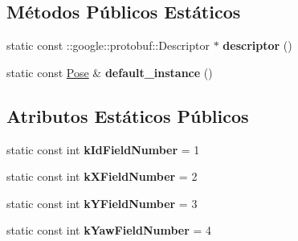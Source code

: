 \subsection*{Métodos Públicos Estáticos}
\begin{DoxyCompactItemize}
\item 
static const \+::google\+::protobuf\+::\+Descriptor $\ast$ {\bfseries descriptor} ()\hypertarget{classvss__debug_1_1Pose_a3d781b52c5eb085b6c826f82c216f373}{}\label{classvss__debug_1_1Pose_a3d781b52c5eb085b6c826f82c216f373}

\item 
static const \hyperlink{classvss__debug_1_1Pose}{Pose} \& {\bfseries default\+\_\+instance} ()\hypertarget{classvss__debug_1_1Pose_ae87e9b283f3406bafcb9412dc889f5f6}{}\label{classvss__debug_1_1Pose_ae87e9b283f3406bafcb9412dc889f5f6}

\end{DoxyCompactItemize}
\subsection*{Atributos Estáticos Públicos}
\begin{DoxyCompactItemize}
\item 
static const int {\bfseries k\+Id\+Field\+Number} = 1\hypertarget{classvss__debug_1_1Pose_ac1628279f5a8d48ca973175edd43620a}{}\label{classvss__debug_1_1Pose_ac1628279f5a8d48ca973175edd43620a}

\item 
static const int {\bfseries k\+X\+Field\+Number} = 2\hypertarget{classvss__debug_1_1Pose_a6abea7e231aa91207b15d554976fb877}{}\label{classvss__debug_1_1Pose_a6abea7e231aa91207b15d554976fb877}

\item 
static const int {\bfseries k\+Y\+Field\+Number} = 3\hypertarget{classvss__debug_1_1Pose_a9330e946308fc1a78c01fcc9563ac017}{}\label{classvss__debug_1_1Pose_a9330e946308fc1a78c01fcc9563ac017}

\item 
static const int {\bfseries k\+Yaw\+Field\+Number} = 4\hypertarget{classvss__debug_1_1Pose_a23e9fa2a03ccd5d99a6aa14c0e801346}{}\label{classvss__debug_1_1Pose_a23e9fa2a03ccd5d99a6aa14c0e801346}

\end{DoxyCompactItemize}
